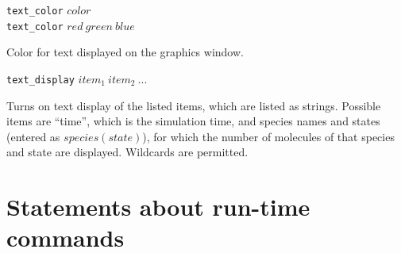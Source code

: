\documentclass {scrbook}
\newcommand {\ttt} {\texttt}
\begin{document}
\begin{description}
\item{\ttt{text\_color} $color$\\
\ttt{text\_color} $red\ green\ blue$}

Color for text displayed on the graphics window.

\item{\ttt{text\_display} $item_1\ item_2\ ...$}

Turns on text display of the listed items, which are listed as strings. Possible items are ``time'', which is the simulation time, and species names and states (entered as $species(state)$), for which the number of molecules of that species and state are displayed. Wildcards are permitted.

\end{description}

\section{Statements about run-time commands}
\end{document}
